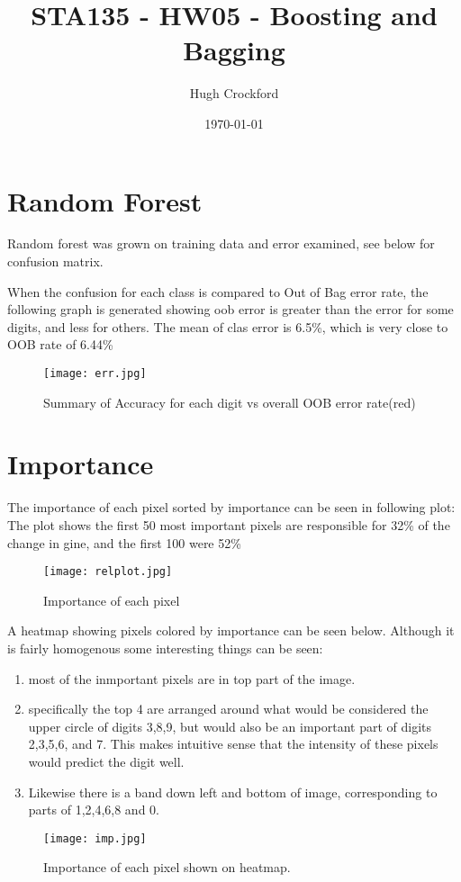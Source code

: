\documentclass[12pt]{article}
\title{STA135 - HW05 - Boosting and Bagging}
\author{Hugh Crockford}
\date{\today}
\begin{document}
	\maketitle

	\section{Random Forest}
		Random forest was grown on training data and error examined, see below for confusion matrix. 
		

		When the confusion for each class is compared to Out of Bag error rate, the following graph is generated showing oob error is greater than the error for some digits, and less for others. The mean of clas error is 6.5\%, which is very close to OOB rate of 6.44\%

			\begin{figure}[H]
				\centering
				\texttt{[image: err.jpg]}
				\caption{Summary of Accuracy for each digit vs overall OOB error rate(red)}
			\end{figure}
	\section{Importance}
		The importance of each pixel sorted by importance can be seen in following plot:
		The plot shows the first 50 most important pixels are responsible for 32\% of the change in gine, and the first 100 were 52\%
			\begin{figure}[H]
				\centering
				\texttt{[image: relplot.jpg]}
				\caption{Importance of each pixel}
			\end{figure}

		A heatmap showing pixels colored by importance can be seen below.
		Although it is fairly homogenous some interesting things can be seen:
		\begin{enumerate}
			\item most of the inmportant pixels are in top part of the image.
			\item specifically the top 4 are arranged around what would be considered the upper circle of digits 3,8,9, but would also be an important part of digits 2,3,5,6, and 7. This makes intuitive sense that the intensity of these pixels would predict the digit well.
			\item Likewise there is a band down left and bottom of image, corresponding to parts of 1,2,4,6,8 and 0.
		\end{enumerate}
			\begin{figure}[H]
				\centering
				\texttt{[image: imp.jpg]}
				\caption{Importance of each pixel shown on heatmap.}
			\end{figure}
\end{document}
